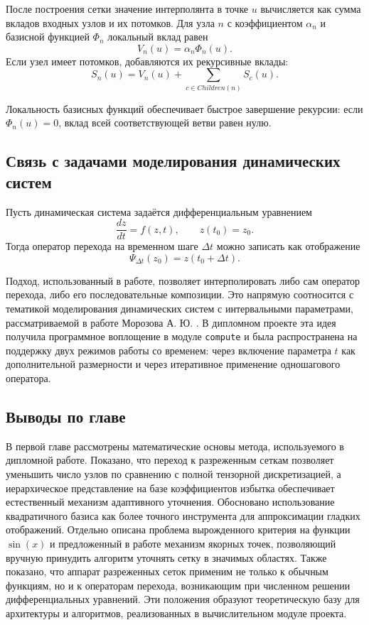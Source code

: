 После построения сетки значение интерполянта в точке $u$ вычисляется как сумма вкладов входных узлов и их потомков. Для узла $n$ с коэффициентом $\alpha_n$ и базисной функцией $\Phi_n$ локальный вклад равен
\begin{equation}
    V_n(u) = \alpha_n \Phi_n(u).
\end{equation}
Если узел имеет потомков, добавляются их рекурсивные вклады:
\begin{equation}
    S_n(u) = V_n(u) + \sum_{c \in Children(n)} S_c(u).
\end{equation}

Локальность базисных функций обеспечивает быстрое завершение рекурсии: если $\Phi_n(u)=0$, вклад всей соответствующей ветви равен нулю.

\subsection{Связь с задачами моделирования динамических систем}

Пусть динамическая система задаётся дифференциальным уравнением
\begin{equation}
    \frac{dz}{dt} = f(z,t), \qquad z(t_0)=z_0.
\end{equation}
Тогда оператор перехода на временном шаге $\Delta t$ можно записать как отображение
\begin{equation}
    \Psi_{\Delta t}(z_0)=z(t_0+\Delta t).
\end{equation}

Подход, использованный в работе, позволяет интерполировать либо сам оператор перехода, либо его последовательные композиции. Это напрямую соотносится с тематикой моделирования динамических систем с интервальными параметрами, рассматриваемой в работе Морозова А. Ю. \cite{Morozov2024}. В дипломном проекте эта идея получила программное воплощение в модуле \texttt{compute} и была распространена на поддержку двух режимов работы со временем: через включение параметра $t$ как дополнительной размерности и через итеративное применение одношагового оператора.

\subsection*{Выводы по главе}

В первой главе рассмотрены математические основы метода, используемого в дипломной работе. Показано, что переход к разреженным сеткам позволяет уменьшить число узлов по сравнению с полной тензорной дискретизацией, а иерархическое представление на базе коэффициентов избытка обеспечивает естественный механизм адаптивного уточнения. Обосновано использование квадратичного базиса как более точного инструмента для аппроксимации гладких отображений. Отдельно описана проблема вырожденного критерия на функции $\sin(x)$ и предложенный в работе механизм якорных точек, позволяющий вручную принудить алгоритм уточнять сетку в значимых областях. Также показано, что аппарат разреженных сеток применим не только к обычным функциям, но и к операторам перехода, возникающим при численном решении дифференциальных уравнений. Эти положения образуют теоретическую базу для архитектуры и алгоритмов, реализованных в вычислительном модуле проекта.